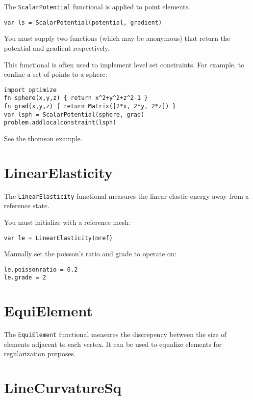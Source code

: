 The \texttt{ScalarPotential} functional is applied to point elements.

\begin{lstlisting}
var ls = ScalarPotential(potential, gradient)
\end{lstlisting}

You must supply two functions (which may be anonymous) that return the
potential and gradient respectively.

This functional is often used to implement level set constraints. For
example, to confine a set of points to a sphere:

\begin{lstlisting}
import optimize
fn sphere(x,y,z) { return x^2+y^2+z^2-1 }
fn grad(x,y,z) { return Matrix([2*x, 2*y, 2*z]) }
var lsph = ScalarPotential(sphere, grad)
problem.addlocalconstraint(lsph)
\end{lstlisting}

See the thomson example.

\hypertarget{linearelasticity}{%
\section{LinearElasticity}\label{linearelasticity}}

The \texttt{LinearElasticity} functional measures the linear elastic
energy away from a reference state.

You must initialize with a reference mesh:

\begin{lstlisting}
var le = LinearElasticity(mref)
\end{lstlisting}

Manually set the poisson's ratio and grade to operate on:

\begin{lstlisting}
le.poissonratio = 0.2
le.grade = 2
\end{lstlisting}

\hypertarget{equielement}{%
\section{EquiElement}\label{equielement}}

The \texttt{EquiElement} functional measures the discrepency between the
size of elements adjacent to each vertex. It can be used to equalize
elements for regularization purposes.

\hypertarget{linecurvaturesq}{%
\section{LineCurvatureSq}\label{linecurvaturesq}}

